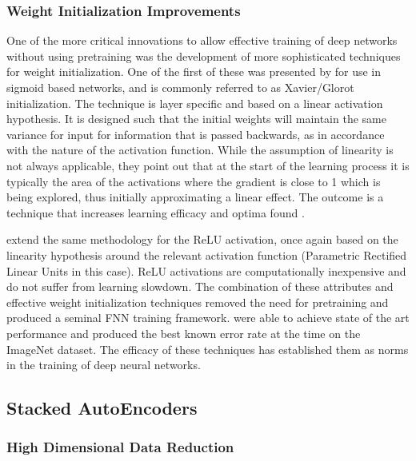 \documentclass[a4paper,11pt,oneside]{article}
\theoremstyle{plain}
\theoremstyle{definition}
\begin{document}
	\subsubsection{Weight Initialization Improvements}\label{lr_weight_init}
	
	One of the more critical innovations to allow effective training of deep networks without using pretraining was the development of more sophisticated techniques for weight initialization. One of the first of these was presented by \citet{Glorot} for use in sigmoid based networks, 
	and is commonly referred to as Xavier/Glorot initialization. The technique is layer specific and based on a linear activation
	hypothesis. It is designed such that the initial weights will maintain the same variance for input for information that is passed backwards, as in 
	accordance with the nature of the activation function. While the assumption of linearity is not always applicable, they point out that at the 
	start of the learning process it is typically the area of the activations where the gradient is close to 1 which is being explored, thus initially approximating 
	a linear effect. The outcome is a technique that increases learning efficacy and optima found \citep{Glorot}. \newline
	
	\citet{He} extend the same methodology for the ReLU activation, once again based on the linearity hypothesis around the 
	relevant activation function (Parametric Rectified Linear Units in this case). ReLU activations are computationally inexpensive and do not suffer from learning slowdown. The combination of these attributes and effective weight initialization techniques removed the need for pretraining and produced a seminal FNN training framework. \citet{He} were able to 
	achieve state of the art performance and produced the best known error rate at the time on the ImageNet dataset. The efficacy of these techniques has established 
	them as norms in the training of deep neural networks.
	
	
	\subsection{Stacked AutoEncoders}\label{lr_SAE}
	
	\subsubsection{High Dimensional Data Reduction}\label{HDDR}
	
\end{document}

